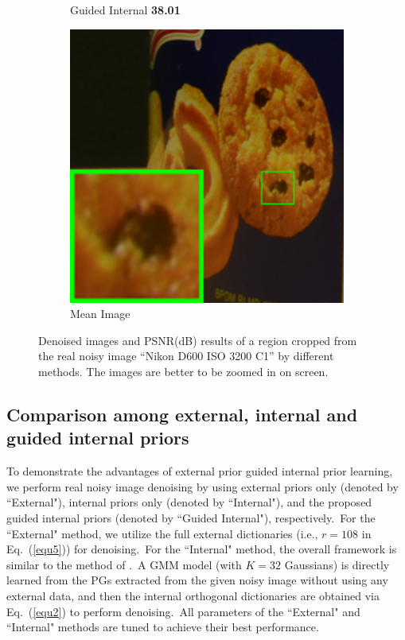 \begin{figure}
\begin{subfigure}[t]{0.19\textwidth}
\caption{ Guided Internal \textbf{38.01}}
    \end{subfigure}
    \hfill
    \begin{subfigure}[t]{0.19\textwidth}
        \centering
        \includegraphics[width=1\textwidth]{images/guided/resize_br_Mean_CC_Noisy_Nikon_D600_ISO_3200_C1_94b.png}
\caption{Mean Image}
    \end{subfigure}
    \caption{Denoised images and PSNR(dB) results of a region cropped from the real noisy image ``Nikon D600 ISO 3200 C1'' \cite{crosschannel2016} by different methods. The images are better to be zoomed in on screen.}
    \label{fig7}
\end{figure}


\subsection{Comparison among external, internal and guided internal priors}

To demonstrate the advantages of external prior guided internal prior learning, we perform real noisy image denoising by using external priors only (denoted by ``External"), internal priors only (denoted by ``Internal"), and the proposed guided internal priors (denoted by ``Guided Internal"), respectively.\ For the ``External" method, we utilize the full external dictionaries (i.e., $r=108$ in Eq.\ (\ref{equ5})) for denoising.\ For the ``Internal" method, the overall framework is similar to the method of \cite{ncsr}.\ A GMM model (with $K = 32$ Gaussians) is directly learned from the PGs extracted from the given noisy image without using any external data, and then the internal orthogonal dictionaries are obtained via Eq.\ (\ref{equ2}) to perform denoising.\ All parameters of the ``External" and ``Internal" methods are tuned to achieve their best performance. 

